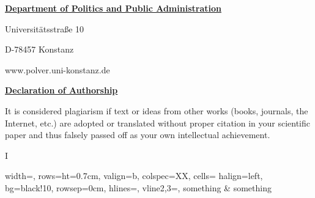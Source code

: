 {\small

\thispagestyle{page1}


\setlength{\parindent}{0cm}
\myhelvetica

{
    \raggedleft
    \small

    \textbf{\normalsize\ul{Department of Politics and Public Administration}}

    \scriptsize
    \vspace{0.4cm}

    Universitätsstraße 10

    D-78457 Konstanz

    \vspace{0.2cm}

    www.polver.uni-konstanz.de

}

\vspace{0.25cm}
\begingroup
{\large{\textbf{\ul{Declaration of Authorship}}}}

\raggedright
\vspace{0.5cm}

It is considered plagiarism if text or ideas from other works (books, journals, the Internet, etc.) are adopted or translated without proper citation in your scientific paper and thus falsely passed off as your own intellectual achievement.

\vspace{0.5cm}

\begin{minipage}[c]{0.05\textwidth}
    I
\end{minipage}\begin{minipage}{0.95\textwidth}
        \begin{tblr}{
            width=\linewidth,
            rows={ht=0.7cm, valign=b},
            colspec={XX},
            cells= {halign=left, bg=black!10},
            rowsep=0cm,
            hlines={},
            vline{2,3}={},
        }
        something & something\\
        \end{tblr}
\end{minipage}

}
